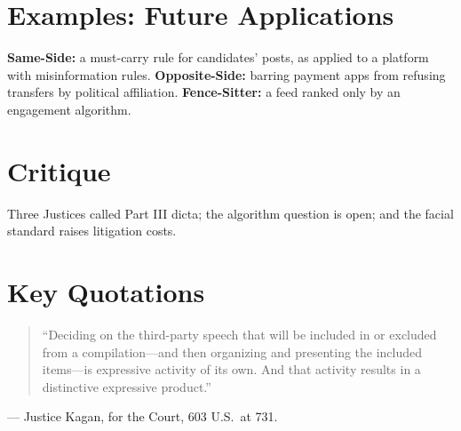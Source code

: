 \documentclass[12pt]{article}
\begin{document}
\section{Examples: Future Applications}
\textbf{Same-Side:} a must-carry rule for candidates' posts, as applied to a platform with misinformation rules. \textbf{Opposite-Side:} barring payment apps from refusing transfers by political affiliation. \textbf{Fence-Sitter:} a feed ranked only by an engagement algorithm.

\section{Critique}
Three Justices called Part III dicta; the algorithm question is open; and the facial standard raises litigation costs.

\section{Key Quotations}
\begin{quote}
``Deciding on the third-party speech that will be included in or excluded from a compilation---and then organizing and presenting the included items---is expressive activity of its own. And that activity results in a distinctive expressive product.''
\end{quote}
\noindent --- Justice Kagan, for the Court, 603 U.S.\ at 731.
\end{document}
